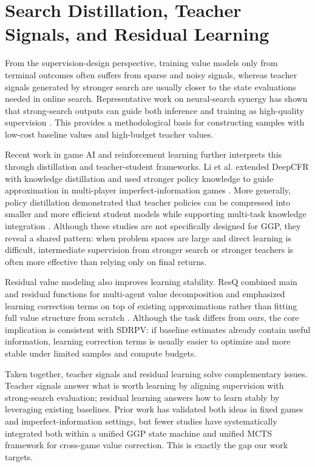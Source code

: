 \section{Search Distillation, Teacher Signals, and Residual Learning}

From the supervision-design perspective, training value models only from terminal outcomes often suffers from sparse and noisy signals, whereas teacher signals generated by stronger search are usually closer to the state evaluations needed in online search. Representative work on neural-search synergy has shown that strong-search outputs can guide both inference and training as high-quality supervision \cite{anthony2017thinking,silver2018general}. This provides a methodological basis for constructing samples with low-cost baseline values and high-budget teacher values.

Recent work in game AI and reinforcement learning further interprets this through distillation and teacher-student frameworks. Li et al. extended DeepCFR with knowledge distillation and used stronger policy knowledge to guide approximation in multi-player imperfect-information games \cite{li2023kdbd2cfr}. More generally, policy distillation demonstrated that teacher policies can be compressed into smaller and more efficient student models while supporting multi-task knowledge integration \cite{rusu2015policy}. Although these studies are not specifically designed for GGP, they reveal a shared pattern: when problem spaces are large and direct learning is difficult, intermediate supervision from stronger search or stronger teachers is often more effective than relying only on final returns.

Residual value modeling also improves learning stability. ResQ combined main and residual functions for multi-agent value decomposition and emphasized learning correction terms on top of existing approximations rather than fitting full value structure from scratch \cite{shen2022resq}. Although the task differs from ours, the core implication is consistent with SDRPV: if baseline estimates already contain useful information, learning correction terms is usually easier to optimize and more stable under limited samples and compute budgets.

Taken together, teacher signals and residual learning solve complementary issues. Teacher signals answer what is worth learning by aligning supervision with strong-search evaluation; residual learning answers how to learn stably by leveraging existing baselines. Prior work has validated both ideas in fixed games and imperfect-information settings, but fewer studies have systematically integrated both within a unified GGP state machine and unified MCTS framework for cross-game value correction. This is exactly the gap our work targets.

